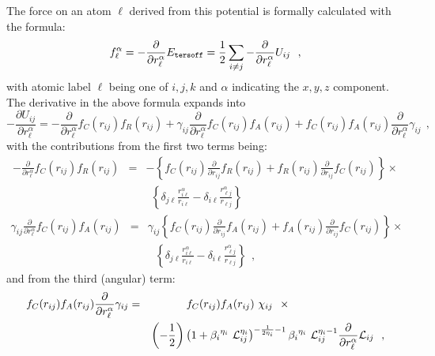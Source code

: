 The force on an atom $\ell$ derived from this potential is
formally calculated with the formula:
\begin{equation}
f_{\ell}^{\alpha} = -\frac{\partial}{\partial r_{\ell}^{\alpha}}
E_{\tt tersoff} = \frac{1}{2} \sum_{i \neq j}
-\frac{\partial}{\partial r_{\ell}^{\alpha}} U_{ij}~~,
\end{equation}
with atomic label $\ell$ being one of $i,j,k$ and $\alpha$
indicating the $x,y,z$ component.  The derivative in the above formula
expands into
\begin{equation}
-\frac{\partial U_{ij}}{\partial r_{\ell}^{\alpha}} =
-\frac{\partial}{\partial r_{\ell}^{\alpha}} f_{C}(r_{ij}) f_{R}(r_{ij}) +
 \gamma_{ij} \frac{\partial}{\partial r_{\ell}^{\alpha}} f_{C}(r_{ij}) f_{A}(r_{ij}) +
 f_{C}(r_{ij}) f_{A}(r_{ij}) \frac{\partial}{\partial r_{\ell}^{\alpha}} \gamma_{ij}~~,
\end{equation}
with the contributions from the first two terms being:
\begin{eqnarray}
-\frac{\partial}{\partial r_{\ell}^{\alpha}} f_{C}(r_{ij}) f_{R}(r_{ij})&=&
-\left\{ f_{C}(r_{ij}) \frac{\partial}{\partial r_{ij}} f_{R}(r_{ij}) +
f_{R}(r_{ij}) \frac{\partial}{\partial r_{ij}} f_{C}(r_{ij}) \right\} \times \nonumber \\
& & ~~\left\{ \delta_{j \ell} \frac{r_{i \ell}^{\alpha}}{r_{i \ell}} -
\delta_{i \ell} \frac{r_{\ell j}^{\alpha}}{r_{\ell j}} \right\}
\end{eqnarray}
\begin{eqnarray}
\gamma_{ij} \frac{\partial}{\partial r_{\ell}^{\alpha}} f_{C}(r_{ij}) f_{A}(r_{ij})&=&
\gamma_{ij} \left\{ f_{C}(r_{ij}) \frac{\partial}{\partial r_{ij}} f_{A}(r_{ij}) +
f_{A}(r_{ij}) \frac{\partial}{\partial r_{ij}} f_{C}(r_{ij}) \right\} \times \nonumber \\
& & ~~~\left\{ \delta_{j \ell} \frac{r_{i \ell}^{\alpha}}{r_{i \ell}} -
\delta_{i \ell} \frac{r_{\ell j}^{\alpha}}{r_{\ell j}} \right\}~~,
\end{eqnarray}
and from the third (angular) term:
\begin{eqnarray}
f_{C}(r_{ij}) f_{A}(r_{ij}) \frac{\partial}{\partial r_{\ell}^{\alpha}} \gamma_{ij}&=&
f_{C}(r_{ij}) f_{A}(r_{ij})~\chi_{ij}~~\times ~~~~~~~~~~~~~~~~~~~~~~~~~~ \nonumber \\
& & \left( -\frac{1}{2} \right) \left( 1 + {\beta_{i}}^{\eta_{i}}~{\cal{L}}_{ij}^{\eta_{i}}
\right)^{-\frac{1}{2 \eta_{i}} - 1} {\beta_{i}}^{\eta_{i}}~{\cal{L}}_{ij}^{\eta_{i}-1}
\frac{\partial}{\partial r_{\ell}^{\alpha}} {\cal{L}}_{ij}~~,
\end{eqnarray}
